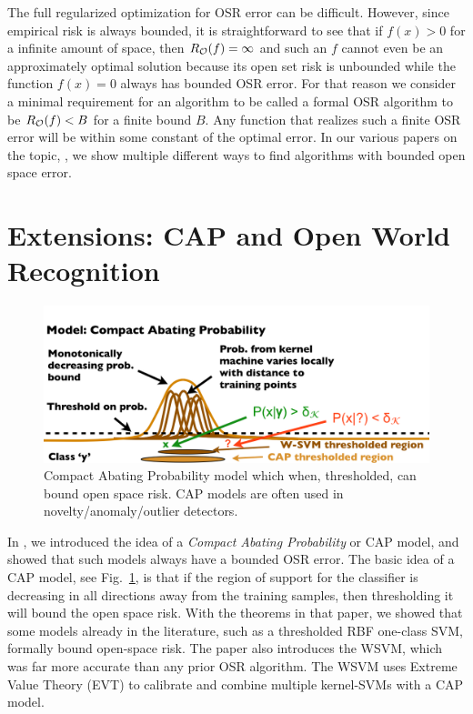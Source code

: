 \documentclass[letterpaper]{article}
\begin{document}
The full regularized optimization for OSR error can be difficult.  However,  since empirical risk is always bounded,  it is straightforward  to see that if $f(x)>0$ for a infinite amount of space, then $R_{{\cal O}}(f)= \infty$ and such an $f$ cannot even be an approximately optimal solution because its open set risk is unbounded while the function $f(x)=0$ always has bounded OSR error.     For that reason we consider a minimal requirement for an algorithm to be called a formal OSR algorithm to be $R_{{\cal O}}(f) < B$ for a finite bound $B$.   Any function that realizes such a finite OSR error will be within some constant of the optimal error. In our various papers on the topic, \cite{walter2014,bendale2015towards,junior2016specialized,rudd2018extreme},  we show multiple different ways to find algorithms with bounded open space error.  

\section{Extensions: CAP and Open World Recognition}
\begin{figure}
\center
\includegraphics[width=.8\columnwidth]{CAP.png}
\caption{Compact Abating Probability model which when, thresholded, can bound open space risk. CAP models are often used in novelty/anomaly/outlier detectors.}
\label{fig:cap}
\end{figure}


In  \cite{walter2014}, we introduced the idea of a \textit{Compact Abating Probability} or CAP model, and showed that such models always have a bounded OSR error.
The basic idea of a CAP model, see Fig.~\ref{fig:cap}, is that if the region of support for the classifier is decreasing in all directions away from the training samples, then thresholding it will bound the open space risk.  
With the theorems in that paper, we showed that some models already in the literature, such as a thresholded RBF one-class SVM, formally bound open-space risk.
The paper also introduces the WSVM, which was far more accurate than any prior OSR algorithm.  The WSVM uses Extreme Value Theory (EVT) to calibrate and combine multiple kernel-SVMs with a CAP model.    
\end{document}

